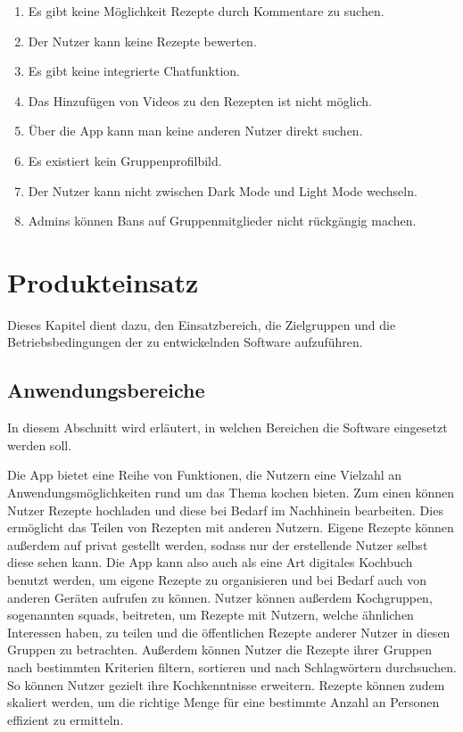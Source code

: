 \documentclass[parskip=full]{scrartcl}
\begin{document}
\begin{enumerate}[start=1,label={$\langle$\bfseries RW\arabic*$\rangle$}, leftmargin = 5em, itemsep=4pt, parsep=4pt]
    \item Es gibt keine Möglichkeit Rezepte durch Kommentare zu suchen.
    \item Der Nutzer kann keine Rezepte bewerten.
    \item Es gibt keine integrierte Chatfunktion.
    \item Das Hinzufügen von Videos zu den Rezepten ist nicht möglich.
    \item Über die App kann man keine anderen Nutzer direkt suchen.
    \item Es existiert kein Gruppenprofilbild.
    \item Der Nutzer kann nicht zwischen Dark Mode und Light Mode wechseln.
    \item Admins können Bans auf Gruppenmitglieder nicht rückgängig machen.
\end{enumerate}

\section{Produkteinsatz}
Dieses Kapitel dient dazu, den Einsatzbereich, die Zielgruppen und die Betriebsbedingungen der zu entwickelnden Software aufzuführen.

\subsection{Anwendungsbereiche}
In diesem Abschnitt wird erläutert, in welchen Bereichen die Software eingesetzt werden soll. \par
Die App bietet eine Reihe von Funktionen, die Nutzern eine Vielzahl an Anwendungsmöglichkeiten rund um das Thema kochen bieten.
Zum einen können Nutzer Rezepte hochladen und diese bei Bedarf im Nachhinein bearbeiten.
Dies ermöglicht das Teilen von Rezepten mit anderen Nutzern. Eigene Rezepte können außerdem auf privat gestellt werden, sodass nur der erstellende Nutzer selbst diese sehen kann.
Die App kann also auch als eine Art digitales Kochbuch benutzt werden, um eigene Rezepte zu organisieren und bei Bedarf auch von anderen Geräten aufrufen zu können.
Nutzer können außerdem Kochgruppen, sogenannten \Gls{squad}s, beitreten, um Rezepte mit Nutzern, welche ähnlichen Interessen haben, zu teilen und die öffentlichen Rezepte anderer Nutzer in diesen Gruppen zu betrachten. Außerdem können Nutzer die Rezepte ihrer Gruppen nach bestimmten Kriterien filtern, sortieren und nach Schlagwörtern durchsuchen. So können Nutzer gezielt ihre Kochkenntnisse erweitern.
Rezepte können zudem skaliert werden, um die richtige Menge für eine bestimmte Anzahl an Personen effizient zu ermitteln.
\end{document}
